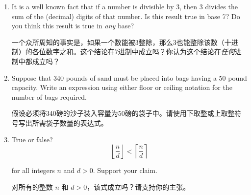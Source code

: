 \begin{enumerate}
  
  \wbvfill
  
  \hintspagebreak
  \workbookpagebreak
  
  \item It is a well known fact that if a number is divisible by 3, then 3
    divides the sum of the (decimal) digits of that number.
  Is this
    result true in base 7?  Do you think this result is true in {\em
    any} base?
    
    一个众所周知的事实是，如果一个数能被3整除，那么3也能整除该数（十进制）的各位数字之和。这个结论在7进制中成立吗？你认为这个结论在{\em 任何}进制中都成立吗？
  \wbvfill
   
  
  \item Suppose that 340 pounds of sand must be placed into bags having
    a 50 pound capacity.
  Write an expression using either floor or
    ceiling notation for the number of bags required.
    
    假设必须将340磅的沙子装入容量为50磅的袋子中。请使用下取整或上取整符号写出所需袋子数量的表达式。
  \wbvfill
  
  
  \textbookpagebreak
  
  \item True or false?
   \[ \left\lfloor \frac{n}{d}\right\rfloor < \left\lceil \frac{n}{d}\right\rceil \]
   
  \noindent for all integers $n$ and $d>0$.  Support your claim.
  
  对所有的整数 $n$ 和 $d>0$，该式成立吗？请支持你的主张。
  \wbvfill
  
  

\end{enumerate}
